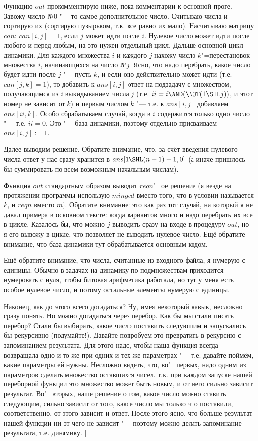 Функцию $out$ прокомментирую ниже, пока комментарии к основной проге. Завожу число №0 "--- то самое дополнительное число. Считываю числа и сортирую их (сортирую пузырьком, т.к. все равно их мало). Насчитываю матрицу $can$: $can[i,j]=1$, если $j$ может идти после $i$. Нулевое число может идти после любого и перед любым, на это нужен отдельный цикл. Дальше основной цикл динамики. Для каждого множества $i$ и каждого $j$ нахожу число $k$"=перестановок множества $i$, начинающихся на число №$j$. Ясно, что надо перебрать, какое число будет идти после $j$ "--- пусть $k$, и если оно действительно может идти (т.е. $can[j,k]=1$), то добавить к $ans[i,j]$ ответ на подзадачу с множеством, получающимся из $i$ выкидыванием числа $j$ (т.е. $ii=i \AND (\NOT (1 \SHL j))$, и этот номер не зависит от $k$) и первым числом $k$ "--- т.е. к $ans[i,j]$ добавляем $ans[ii,k]$. Особо обрабатываем случай, когда в $i$ содержится только одно число "--- т.е. $ii=0$. Это "--- база динамики, поэтому отдельно присваиваем $ans[i,j]:=1$.

Далее выводим решение. Обратите внимание, что, за счёт введения нулевого числа ответ у нас сразу хранится в $ans[1 \SHL (n+1)-1,0]$ (а иначе пришлось бы суммировать по всем возможным начальным числам).

Функция $out$ стандартным образом выводит $reqn$"=ое решение (я везде на протяжении программы использую $mingcd$ вместо того, что в условии называется $k$, и $reqn$ вместо $m$). Обратите внимание: это как раз тот случай, на который я не давал примера в основном тексте: когда вариантов много и надо перебрать их все в цикле. Казалось бы, что можно $j$ выводить сразу на входе в процедуру $out$, но я его вывожу в цикле, что позволяет не выводить нулевое число. Ещё обратите внимание, что база динамики тут обрабатывается основным кодом.

Ещё обратите внимание, что числа, считанные из входного файла, я нумерую с единицы. Обычно в задачах на динамику по подмножествам приходится нумеровать с нуля, чтобы  битовая арифметика работала, но тут у меня есть особое нулевое число, и потому остальные элементы нумерую с единицы.

Наконец, как до этого всего догадаться? Ну, имея некоторый навык, несложно сразу понять. Но можно догадаться через перебор. Как бы мы стали писать перебор? Стали бы выбирать, какое число поставить следующим и запускались бы рекурсивно (подумайте!). Давайте попробуем это превратить в рекурсию с запоминанием результата. Для этого надо, чтобы наша функция всегда возвращала одно и то же при одних и тех же параметрах "--- т.е. давайте поймём, какие параметры ей нужны. Несложно видеть, что, во"=первых, надо одним из параметров сделать множество оставшихся чисел, т.к. при каждом запуске нашей переборной функции это множество может быть новым, и от него сильно зависит результат. Во"=вторых, наше решение о том, какое число можно ставить следующим, сильно зависит от того, какое число мы только что поставили, соответственно, от этого зависит и ответ. После этого ясно, что больше результат нашей функции ни от чего не зависит "--- поэтому можно делать запоминание результата, т.е. динамику.
|

